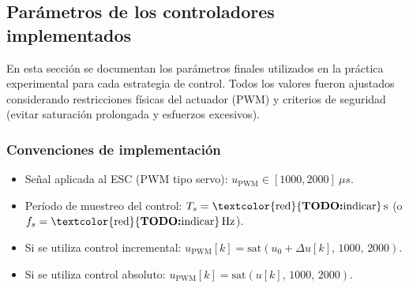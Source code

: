 

\providecommand{\TODO}[1]{\textcolor{red}{\textbf{TODO:} #1}}

\providecommand{\TODOm}[1]{\mathrm{\TODO{#1}}}

\newcommand{\coef}[1]{\ensuremath{\mathbf{#1}}}

\subsection{Parámetros de los controladores implementados}
\label{sec:param_ctrl}

En esta sección se documentan los parámetros finales utilizados en la práctica experimental para cada estrategia de control.
Todos los valores fueron ajustados considerando restricciones físicas del actuador (PWM) y criterios de seguridad (evitar saturación prolongada y esfuerzos excesivos).

\subsubsection{Convenciones de implementación}
\label{sec:conv_impl}

\begin{itemize}
	\item Señal aplicada al ESC (PWM tipo servo): \(u_{\text{PWM}} \in [1000,2000]\ \mu s\).
	\item Período de muestreo del control: \(T_s=\TODOm{indicar}\,\text{s}\) (o \(f_s=\TODOm{indicar}\,\text{Hz}\)).
	\item Si se utiliza control incremental: \(u_{\text{PWM}}[k]=\mathrm{sat}\!\left(u_0+\Delta u[k],\,1000,\,2000\right)\).
	\item Si se utiliza control absoluto: \(u_{\text{PWM}}[k]=\mathrm{sat}\!\left(u[k],\,1000,\,2000\right)\).
\end{itemize}

